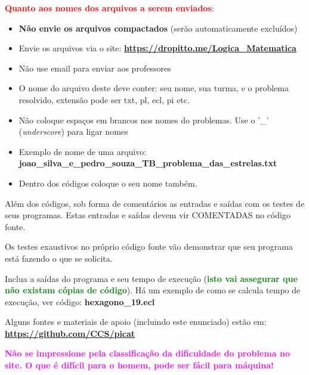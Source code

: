 \documentclass[a4paper,12pt]{article}
\begin{document}
\begin{flushleft}
\vspace{0.5cm}
 \textcolor{red}{\textbf{Quanto aos nomes dos arquivos a serem enviados}}:
\begin{itemize}
  \item \textbf{Não envie os arquivos compactados} (serão automaticamente excluídos)
  \item Envie os arquivos  via o site: \textbf{ \url{https://dropitto.me/Logica_Matematica}}

  \item Não use email para enviar aos professores
  
  \item O nome do arquivo deste deve conter: seu nome,
  sua turma, e o problema resolvido, extensão pode ser txt, pl, ecl, pi etc.
  \item Não coloque espaços em brancos nos nomes do problemas. Use o '\_'  (\textit{underscore}) para ligar nomes
  \item Exemplo de nome de uma arquivo: \\ \textbf{joao\_silva\_e\_pedro\_souza\_TB\_problema\_das\_estrelas.txt}
  \item Dentro dos códigos coloque o seu nome também.
\end{itemize}


\vspace{0.5cm}
 Além dos códigos, sob forma de comentários as 
entradas e saídas com os testes de seus programas. Estas
entradas e saídas devem vir COMENTADAS no código fonte.

\vspace{0.5cm}
 Os testes exaustivos no próprio código fonte vão demonstrar que seu programa está fazendo o que se solicita.

\vspace{0.5cm}
 Inclua a saídas do programa e seu tempo de execução (\textbf{\textcolor{green}{isto vai assegurar que não existam cópias de código}}). Há um exemplo de como se calcula tempo de execução, ver código: \textbf{hexagono\_19.ecl}

\vspace{0.5cm}
 Alguns fontes e materiais de apoio (incluindo este enunciado) estão em: \textbf{\url{https://github.com/CCS/picat}} 

\vspace{0.5cm}
 \textbf{\textcolor{magenta}{Não se impressione pela classificação da dificuldade do problema no site. O que é difícil para o homem, pode ser fácil para máquina!}}

\end{flushleft}
\end{document}
